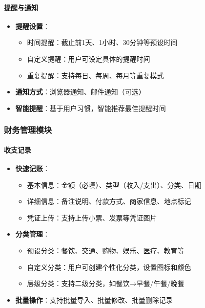 \documentclass[a4paper]{article}
\begin{document}
\paragraph{提醒与通知}
\begin{itemize}
    \item \textbf{提醒设置}：
    \begin{itemize}
        \item 时间提醒：截止前1天、1小时、30分钟等预设时间
        \item 自定义提醒：用户可设定具体的提醒时间
        \item 重复提醒：支持每日、每周、每月等重复模式
    \end{itemize}
    \item \textbf{通知方式}：浏览器通知、邮件通知（可选）
    \item \textbf{智能提醒}：基于用户习惯，智能推荐最佳提醒时间
\end{itemize}

\subsubsection{财务管理模块}

\paragraph{收支记录}
\begin{itemize}
    \item \textbf{快速记账}：
    \begin{itemize}
        \item 基本信息：金额（必填）、类型（收入/支出）、分类、日期
        \item 详细信息：备注说明、付款方式、商家信息、地点标记
        \item 凭证上传：支持上传小票、发票等凭证图片
    \end{itemize}
    \item \textbf{分类管理}：
    \begin{itemize}
        \item 预设分类：餐饮、交通、购物、娱乐、医疗、教育等
        \item 自定义分类：用户可创建个性化分类，设置图标和颜色
        \item 层级分类：支持二级分类，如餐饮→早餐/午餐/晚餐
    \end{itemize}
    \item \textbf{批量操作}：支持批量导入、批量修改、批量删除记录
\end{itemize}
\end{document}
